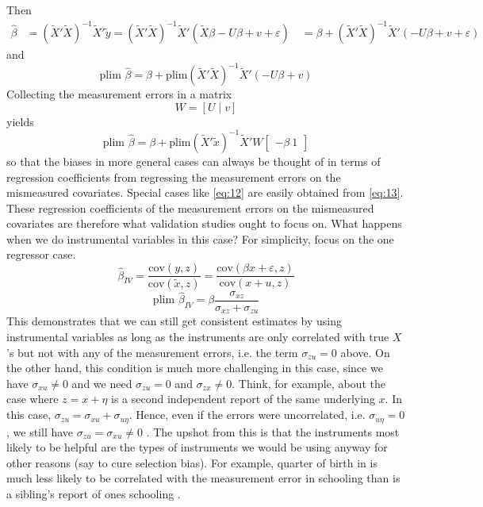 \documentclass[12pt]{article}
\begin{document}
Then
\begin{align*}
\hat{\beta} &= (\tilde{X}'\tilde{X})^{-1}\tilde{X}'\tilde{y} = (\tilde{X}'\tilde{X})^{-1}\tilde{X}'(\tilde{X}\beta - U\beta + v + \varepsilon)\
&= \beta + (\tilde{X}'\tilde{X})^{-1}\tilde{X}'(-U\beta + v + \varepsilon)
\end{align*}
and
\[
\text{plim } \hat{\beta} = \beta + \text{plim}(\tilde{X}'\tilde{X})^{-1}\tilde{X}'(-U\beta + v)
\]
Collecting the measurement errors in a matrix
\[
W = [U \mid v]
\]
yields
\begin{equation}
\label{eq:13}
\text{plim } \hat{\beta} = \beta + \text{plim}(\tilde{X}'\tilde{x})^{-1}\tilde{X}'W\begin{bmatrix} -\beta \ 1 \end{bmatrix}
\end{equation}
so that the biases in more general cases can always be thought of in terms of regression coefficients from regressing the measurement errors on the mismeasured covariates. Special cases like \eqref{eq:12} are easily obtained from \eqref{eq:13}. These regression coefficients of the measurement errors on the mismeasured covariates are therefore what validation studies ought to focus on.
What happens when we do instrumental variables in this case? For simplicity, focus on the one regressor case.
\[
\hat{\beta}_{IV} = \frac{\text{cov}(y, z)}{\text{cov}(\tilde{x}, z)} = \frac{\text{cov}(\beta x + \varepsilon, z)}{\text{cov}(x + u, z)}
\]
\[
\text{plim } \hat{\beta}_{IV} = \beta \frac{\sigma_{xz}}{\sigma_{xz} + \sigma_{zu}}
\]
This demonstrates that we can still get consistent estimates by using instrumental variables as long as the instruments are only correlated with true $X$'s but not with any of the measurement errors, i.e. the term $\sigma_{zu} = 0$ above. On the other hand, this condition is much more challenging in this case, since we have $\sigma_{xu} \neq 0$ and we need $\sigma_{zu} = 0$ and $\sigma_{zx} \neq 0$. Think, for example, about the case where $z = x + \eta$ is a second independent report of the same underlying $x$. In this case, $\sigma_{zu} = \sigma_{xu} + \sigma_{u\eta}$. Hence, even if the errors were uncorrelated, i.e. $\sigma_{u\eta} = 0$, we still have $\sigma_{zu} = \sigma_{xu} \neq 0$ \cite{Black_etal_1998}. The upshot from this is that the instruments most likely to be helpful are the types of instruments we would be using anyway for other reasons (say to cure selection bias). For example, quarter of birth in \cite{Angrist_Krueger_1991} is much less likely to be correlated with the measurement error in schooling than is a sibling's report of ones schooling \cite{Ashenfelter_Krueger_1994}.
\end{document}
